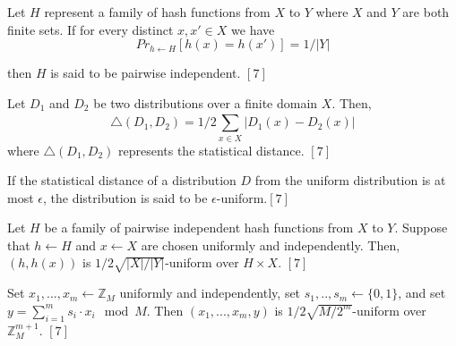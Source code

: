 \documentclass[../../main.tex]{subfiles}
\begin{document}
\begin{defn}
Let $H$ represent a family of hash functions from $X$ to $Y$ where $X$ and $Y$ are both finite sets. If for every distinct $x,x' \in X$ we have
\begin{equation*}
    Pr_{h \leftarrow H}[h(x) = h(x')] = 1/|Y|
\end{equation*}

\noindent then $H$ is said to be pairwise independent. $[7]$
\end{defn}

\begin{defn}
Let $D_1$ and $D_2$ be two distributions over a finite domain $X$. Then,
\begin{equation*}
  \triangle (D_1,D_2)= 1/2\sum_{x \in X}^{}|D_1(x)-D_2(x)|
\end{equation*}
\noindent where $\triangle(D_1,D_2)$ represents the statistical distance. $[7]$
\end{defn}

\begin{defn}
If the statistical distance of a distribution $D$ from the uniform distribution is at most $\epsilon$, the distribution is said to be $\epsilon$-uniform.$[7]$
\end{defn}

\begin{lemma}
Let $H$ be a family of pairwise independent hash functions from $X$ to $Y$. Suppose that $h \leftarrow H$ and $x \leftarrow X$ are chosen uniformly and independently. Then, $(h,h(x))$ is $1/2\sqrt{|X|/|Y|}$-uniform over $H \times X$. $[7]$
\end{lemma}

\begin{lemma}
Set $x_1,...,x_m \leftarrow \mathbb{Z}_M$ uniformly and independently, set $s_1,..,s_m\leftarrow\{0,1\}$, and set $y=\sum_{i=1}^{m}s_i\cdot x_i \mod M$. Then $(x_1,...,x_m,y)$ is $1/2\sqrt{M/2^m}$-uniform over $\mathbb{Z}^{m+1}_M$. $[7]$
\end{lemma}
\end{document}
